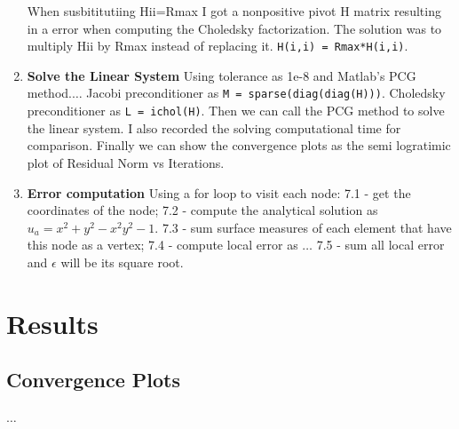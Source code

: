 \documentclass[a4paper, 11pt]{article}
\begin{document}
\begin{enumerate}
				When susbititutiing Hii=Rmax I got a nonpositive pivot H matrix resulting in a error when computing the Choledsky factorization.
				The solution was to multiply Hii by Rmax instead of replacing it. \texttt{H(i,i) = Rmax*H(i,i)}.
				\item \textbf{Solve the Linear System}
				Using tolerance as 1e-8 and Matlab's PCG method.$\ldots$
				Jacobi preconditioner as \texttt{M = sparse(diag(diag(H)))}.
				Choledsky preconditioner as \texttt{L = ichol(H)}.
				Then we can call the PCG method to solve the linear system.
				I also recorded the solving computational time for comparison.
				Finally we can show the convergence plots as the semi logratimic plot of Residual Norm vs Iterations.
				\item \textbf{Error computation}
				Using a for loop to visit each node:
				7.1 - get the coordinates of the node;
				7.2 - compute the analytical solution as $u_a = x^2 + y^2 - x^2y^2 - 1$.
				7.3 - sum surface measures of each element that have this node as a vertex;
				7.4 - compute local error as $\ldots$
				7.5 - sum all local error and $ \epsilon $ will be its square root.	
			\end{enumerate}
			
	
		
		\section{Results}
		
			\subsection{Convergence Plots}
			
				$\ldots$
				
\end{document}
